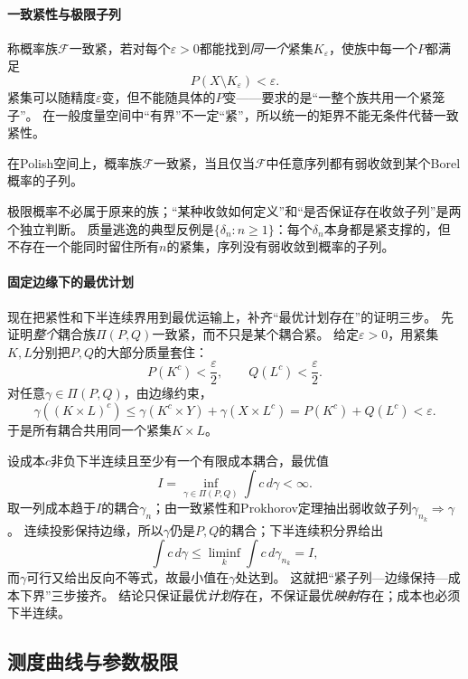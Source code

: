 \paragraph{一致紧性与极限子列}

称概率族$\mathcal F$一致紧，若对每个$\varepsilon>0$都能找到\emph{同一个}紧集$K_\varepsilon$，使族中每一个$P$都满足
\[
 P(X\setminus K_\varepsilon)<\varepsilon.
\]
紧集可以随精度$\varepsilon$变，但不能随具体的$P$变——要求的是“一整个族共用一个紧笼子”。
在一般度量空间中“有界”不一定“紧”，所以统一的矩界不能无条件代替一致紧性。

\begin{theorem}
\label{thm:measure-prokhorov}
在Polish空间上，概率族$\mathcal F$一致紧，当且仅当$\mathcal F$中任意序列都有弱收敛到某个Borel概率的子列。
\end{theorem}

极限概率不必属于原来的族；“某种收敛如何定义”和“是否保证存在收敛子列”是两个独立判断。
质量逃逸的典型反例是$\{\delta_n:n\geq1\}$：每个$\delta_n$本身都是紧支撑的，但不存在一个能同时留住所有$n$的紧集，序列没有弱收敛到概率的子列。

\paragraph{固定边缘下的最优计划}

现在把紧性和下半连续界用到最优运输上，补齐“最优计划存在”的证明三步。
先证明\emph{整个}耦合族$\Pi(P,Q)$一致紧，而不只是某个耦合紧。
给定$\varepsilon>0$，用紧集$K,L$分别把$P,Q$的大部分质量套住：
\[
 P(K^c)<\frac\varepsilon2,\qquad Q(L^c)<\frac\varepsilon2.
\]
对任意$\gamma\in\Pi(P,Q)$，由边缘约束，
\[
 \gamma((K\times L)^c)\leq\gamma(K^c\times Y)+\gamma(X\times L^c)
 =P(K^c)+Q(L^c)<\varepsilon.
\]
于是所有耦合共用同一个紧集$K\times L$。

设成本$c$非负下半连续且至少有一个有限成本耦合，最优值
\[
 I=\inf_{\gamma\in\Pi(P,Q)}\int c\,d\gamma<\infty.
\]
取一列成本趋于$I$的耦合$\gamma_n$；由一致紧性和Prokhorov定理抽出弱收敛子列$\gamma_{n_k}\Rightarrow\gamma$。
连续投影保持边缘，所以$\gamma$仍是$P,Q$的耦合；下半连续积分界给出
\[
 \int c\,d\gamma\leq\liminf_k\int c\,d\gamma_{n_k}=I,
\]
而$\gamma$可行又给出反向不等式，故最小值在$\gamma$处达到。
这就把“紧子列—边缘保持—成本下界”三步接齐。
结论只保证最优\emph{计划}存在，不保证最优\emph{映射}存在；成本也必须下半连续。

\subsection{测度曲线与参数极限}

